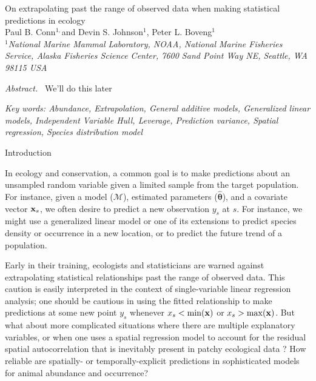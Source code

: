 \documentclass[12pt,english]{article}
\begin{document}
\begin{spacing}{1.9}

\begin{center}
On extrapolating past the range of observed data when making statistical predictions in ecology
\bigskip\\
\normalsize
{\sc Paul B. Conn$^{1,}$\footnotemark[2] and
Devin S. Johnson$^1$, Peter L. Boveng$^1$ }\smallskip\\
$^1${\em National Marine Mammal Laboratory, NOAA, National Marine Fisheries Service,
Alaska Fisheries Science Center, 7600 Sand Point Way NE, Seattle,
WA 98115 USA }\\ \medskip
\end{center}


\raggedright \setlength{\parindent}{0.3in}
{}
 \linenumbers


{\em Abstract.\ } We'll do this later



{\em Key words: Abundance, Extrapolation, General additive models, Generalized linear models, Independent Variable Hull, Leverage, Prediction variance, Spatial regression, Species distribution model}

\centerline{\sc Introduction}


In ecology and conservation, a common goal is to make predictions about an unsampled random variable given a limited sample from the target population.  For instance, given a model ($\mathcal{M}$), estimated parameters ($\hat{\boldsymbol{\theta}}$), and a covariate vector ${\bf x}_s$, we often desire to predict a new observation $y_s$ at $s$.  For instance, we might use a generalized linear model \citep{McCullaghNelder1989} or one of its extensions to predict species density or occurrence in a new location, or to predict the future trend of a population.

Early in their training, ecologists and statisticians are warned against extrapolating statistical relationships
past the range of observed data.  This caution is easily interpreted in the context of single-variable linear regression analysis; one should be cautious in using the fitted relationship to make predictions at some new point $y_s$ whenever $x_s < \min({\bf x})$ or $x_s > \max({\bf x})$.  But what about more complicated situations
where there are multiple explanatory variables, or when one uses a spatial regression model to account for the residual spatial autocorrelation that is inevitably present in patchy ecological data \citep{LichsteinEtAl2002}?  How reliable are spatially- or temporally-explicit predictions in sophisticated models for animal abundance and occurrence?


\end{spacing}
\end{document}
